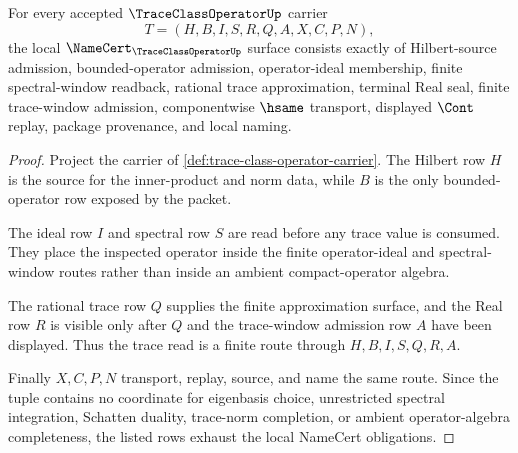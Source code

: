 \begin{theorem}
\label{thm:trace-class-operator-namecert-obligations}
For every accepted $\TraceClassOperatorUp$ carrier
$$
T=(H,B,I,S,R,Q,A,X,C,P,N),
$$
the local $\NameCert_{\TraceClassOperatorUp}$ surface consists exactly of Hilbert-source admission, bounded-operator admission, operator-ideal membership, finite spectral-window readback, rational trace approximation, terminal Real seal, finite trace-window admission, componentwise $\hsame$ transport, displayed $\Cont$ replay, package provenance, and local naming.
\end{theorem}
\begin{proof}
Project the carrier of \autoref{def:trace-class-operator-carrier}. The Hilbert row $H$ is the source for the inner-product and norm data, while $B$ is the only bounded-operator row exposed by the packet.

The ideal row $I$ and spectral row $S$ are read before any trace value is consumed. They place the inspected operator inside the finite operator-ideal and spectral-window routes rather than inside an ambient compact-operator algebra.

The rational trace row $Q$ supplies the finite approximation surface, and the Real row $R$ is visible only after $Q$ and the trace-window admission row $A$ have been displayed. Thus the trace read is a finite route through $H,B,I,S,Q,R,A$.

Finally $X,C,P,N$ transport, replay, source, and name the same route. Since the tuple contains no coordinate for eigenbasis choice, unrestricted spectral integration, Schatten duality, trace-norm completion, or ambient operator-algebra completeness, the listed rows exhaust the local NameCert obligations.
\end{proof}

